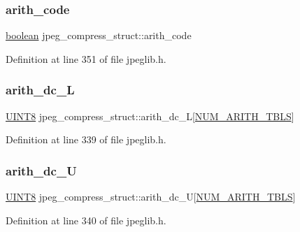 \subsubsection{\texorpdfstring{arith\_code}{arith\_code}}
{\footnotesize\ttfamily \mbox{\hyperlink{jmorecfg_8h_a7c6368b321bd9acd0149b030bb8275ed}{boolean}} jpeg\+\_\+compress\+\_\+struct\+::arith\+\_\+code}



Definition at line 351 of file jpeglib.\+h.

\mbox{\label{structjpeg__compress__struct_a736d867907116e88b3b38422fb2688c5}} 
\subsubsection{\texorpdfstring{arith\_dc\_L}{arith\_dc\_L}}
{\footnotesize\ttfamily \mbox{\hyperlink{jmorecfg_8h_adfb9a8ea1dd59f151065f763e1e9acd6}{U\+I\+N\+T8}} jpeg\+\_\+compress\+\_\+struct\+::arith\+\_\+dc\+\_\+L\mbox{[}\mbox{\hyperlink{jpeglib_8h_a4efb0fccc8d9db72ca18f32a26fad6ab}{N\+U\+M\+\_\+\+A\+R\+I\+T\+H\+\_\+\+T\+B\+LS}}\mbox{]}}



Definition at line 339 of file jpeglib.\+h.

\mbox{\label{structjpeg__compress__struct_a6ba30334643b7a5280343fe0e5e49e1e}} 
\subsubsection{\texorpdfstring{arith\_dc\_U}{arith\_dc\_U}}
{\footnotesize\ttfamily \mbox{\hyperlink{jmorecfg_8h_adfb9a8ea1dd59f151065f763e1e9acd6}{U\+I\+N\+T8}} jpeg\+\_\+compress\+\_\+struct\+::arith\+\_\+dc\+\_\+U\mbox{[}\mbox{\hyperlink{jpeglib_8h_a4efb0fccc8d9db72ca18f32a26fad6ab}{N\+U\+M\+\_\+\+A\+R\+I\+T\+H\+\_\+\+T\+B\+LS}}\mbox{]}}



Definition at line 340 of file jpeglib.\+h.

\mbox{\label{structjpeg__compress__struct_aad43e172d1ec5dd1e369b72ed8753410}} 
